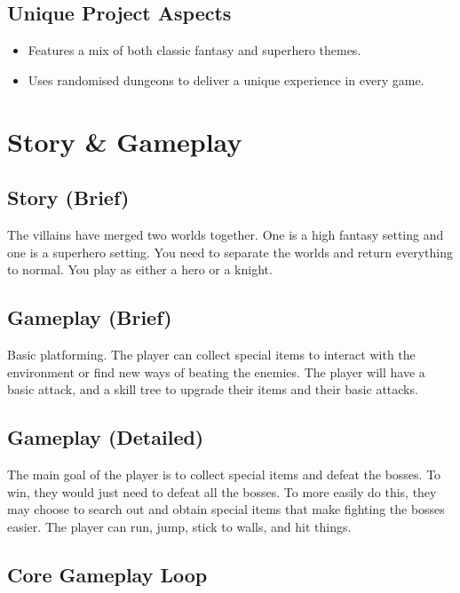 \documentclass[titlepage]{article}
\begin{document}
\subsection{Unique Project Aspects}
\begin{itemize}
	\item Features a mix of both classic fantasy and superhero themes.
	\item Uses randomised dungeons to deliver a unique experience in every game.
\end{itemize}

\section{Story \& Gameplay}
\subsection*{Story (Brief)}
The villains have merged two worlds together. One is a high fantasy setting and
one is a superhero setting. You need to separate the worlds and return
everything to normal. You play as either a hero or a knight. 

\subsection*{Gameplay (Brief)}
Basic platforming. The player can collect special items to interact with the
environment or find new ways of beating the enemies. The player will have a
basic attack, and a skill tree to upgrade their items and their basic attacks.  

\subsection*{Gameplay (Detailed)}
The main goal of the player is to collect special items and defeat the bosses.
To win, they would just need to defeat all the bosses.
To more easily do this, they may choose to search out and obtain special items that
make fighting the bosses easier. The player can run, jump, stick to walls, and hit
things.

\subsection*{Core Gameplay Loop}
\end{document}

